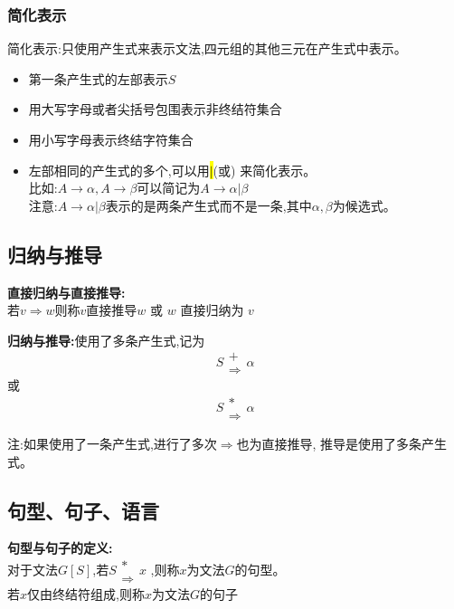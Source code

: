       \subsubsection{简化表示}
      简化表示:只使用产生式来表示文法,四元组的其他三元在产生式中表示。
      \begin{itemize}
        \item 第一条产生式的左部表示$S$
        \item 用大写字母或者尖括号包围表示非终结符集合
        \item 用小写字母表示终结字符集合
        \item 左部相同的产生式的多个,可以用\hl{$|$}(或) 来简化表示。\\
        比如:$A\to \alpha , A \to \beta$可以简记为$A \to \alpha | \beta$\\
        注意:$A \to \alpha | \beta$表示的是两条产生式而不是一条,其中$\alpha , \beta$为候选式。
      \end{itemize}

    \subsection{归纳与推导}
    \textbf{直接归纳与直接推导:}\\
    若$v\Rightarrow w$则称$v$直接推导$w$ 或 $w$ 直接归纳为 $v$

    \spaceline

    \textbf{归纳与推导:}使用了多条产生式,记为
    \begin{equation}
      \renewcommand{\arraystretch}{0.5}
      S \begin{array}{c} + \\ \Rightarrow \end{array} \alpha
    \end{equation}
    或
    \begin{equation}
      \renewcommand{\arraystretch}{0.5}
      S \begin{array}{c} * \\ \Rightarrow \end{array} \alpha
    \end{equation}

    注:如果使用了一条产生式,进行了多次$\Rightarrow$也为直接推导, 推导是使用了多条产生式。

    \subsection{句型、句子、语言}
    \textbf{句型与句子的定义:}\\
    对于文法$G[S]$,若$\renewcommand{\arraystretch}{0.5}S \begin{array}{c} * \\ \Rightarrow \end{array} x$ ,则称$x$为文法$G$的句型。\\
    若$x$仅由终结符组成,则称$x$为文法$G$的句子

